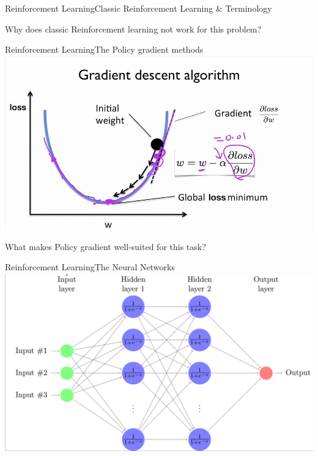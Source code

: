 \documentclass{beamer}
\begin{document}
\begin{frame}{Reinforcement Learning}{Classic Reinforcement Learning \& Terminology\vphantom{(y}}
\vspace{-0.7em}
\begin{centering}
  Why does classic Reinforcement learning not work for this problem?
\end{centering}

\end{frame}

\begin{frame}{Reinforcement Learning}{The Policy gradient methods\vphantom{(y}}
\vspace{-0.7em}
\includegraphics[width=1\textwidth]{images/gradient_descent.png}

What makes Policy gradient well-suited for this task? \\
\end{frame}

\begin{frame}{Reinforcement Learning}{The Neural Networks\vphantom{(y}}
\vspace{-0.7em}
        \includegraphics[width=1\textwidth]{images/NN_illu.png}

\end{frame}
\end{document}
